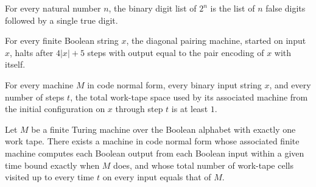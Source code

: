 \begin{theorem}
\label{Turing.bits_two_pow_eq_replicate}
\leanok
{}
For every natural number $n$, the binary digit list of $2^n$ is the list of $n$ false
digits followed by a single true digit.
\end{theorem}

\begin{theorem}
\label{Turing.pairDiagTM_computes}
\leanok
{}
For every finite Boolean string $x$, the diagonal pairing machine, started on input $x$,
halts after $4|x|+5$ steps with output equal to the pair encoding of $x$ with itself.
\end{theorem}

\begin{theorem}
\label{Turing.CodeTM.one_le_spaceUsed}
\leanok
{}
For every machine $M$ in code normal form, every binary input string $x$, and every
number of steps $t$, the total work-tape space used by its associated machine from the
initial configuration on $x$ through step $t$ is at least $1$.
\end{theorem}

\begin{theorem}
\label{Turing.exists_codeTM_spaceUsed}
\leanok
{}
Let $M$ be a finite Turing machine over the Boolean alphabet with exactly one work tape.
There exists a machine in code normal form whose associated finite machine computes each
Boolean output from each Boolean input within a given time bound exactly when $M$ does,
and whose total number of work-tape cells visited up to every time $t$ on every input
equals that of $M$.
\end{theorem}

